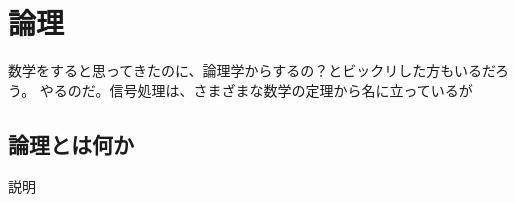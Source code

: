\chapter{論理}

数学をすると思ってきたのに、論理学からするの？とビックリした方もいるだろう。
やるのだ。信号処理は、さまざまな数学の定理から名に立っているが

\section{論理とは何か}

説明